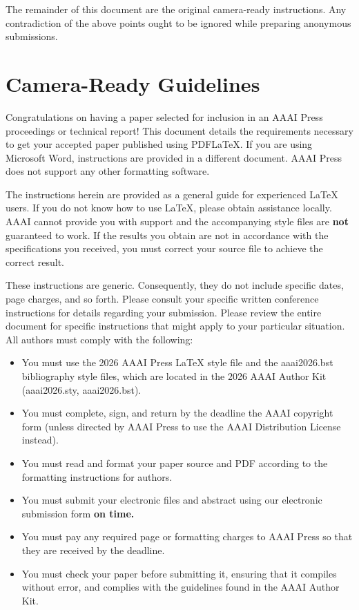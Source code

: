 \documentclass[letterpaper]{article} %
\begin{document}
The remainder of this document are the original camera-ready
instructions. Any contradiction of the above points ought to be ignored
while preparing anonymous submissions.

\section{Camera-Ready Guidelines}\label{camera-ready-guidelines}

Congratulations on having a paper selected for inclusion in an AAAI
Press proceedings or technical report! This document details the
requirements necessary to get your accepted paper published using
PDF{\LaTeX}. If you are using Microsoft Word, instructions are provided
in a different document. AAAI Press does not support any other
formatting software.

The instructions herein are provided as a general guide for experienced
{\LaTeX} users. If you do not know how to use {\LaTeX}, please obtain
assistance locally. AAAI cannot provide you with support and the
accompanying style files are \textbf{not} guaranteed to work. If the
results you obtain are not in accordance with the specifications you
received, you must correct your source file to achieve the correct
result.

These instructions are generic. Consequently, they do not include
specific dates, page charges, and so forth. Please consult your specific
written conference instructions for details regarding your submission.
Please review the entire document for specific instructions that might
apply to your particular situation. All authors must comply with the
following:

\begin{itemize}
\tightlist
\item
  You must use the 2026 AAAI Press {\LaTeX} style file and the
  aaai2026.bst bibliography style files, which are located in the 2026
  AAAI Author Kit (aaai2026.sty, aaai2026.bst).
\item
  You must complete, sign, and return by the deadline the AAAI copyright
  form (unless directed by AAAI Press to use the AAAI Distribution
  License instead).
\item
  You must read and format your paper source and PDF according to the
  formatting instructions for authors.
\item
  You must submit your electronic files and abstract using our
  electronic submission form \textbf{on time.}
\item
  You must pay any required page or formatting charges to AAAI Press so
  that they are received by the deadline.
\item
  You must check your paper before submitting it, ensuring that it
  compiles without error, and complies with the guidelines found in the
  AAAI Author Kit.
\end{itemize}
\end{document}
